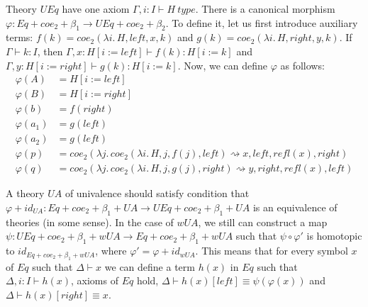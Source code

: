 \documentclass{mscs}
\newcommand{\deq}{\equiv}
\newcommand{\repl}{:=}
\newcommand{\idtype}{\rightsquigarrow}
\numberwithin{figure}{section}
\begin{document}
Theory $UEq$ have one axiom $\Gamma, i : I \vdash H\ type$.
There is a canonical morphism $\varphi : Eq + coe_2 + \beta_1 \to UEq + coe_2 + \beta_2$.
To define it, let us first introduce auxiliary terms: $f(k) = coe_2(\lambda i.\,H, left, x, k)$ and $g(k) = coe_2(\lambda i.\,H, right, y, k)$.
If $\Gamma \vdash k : I$, then $\Gamma, x : H[i \repl left] \vdash f(k) : H[i \repl k]$ and $\Gamma, y : H[i \repl right] \vdash g(k) : H[i \repl k]$.
Now, we can define $\varphi$ as follows:
\begin{align*}
\varphi(A) & = H[i \repl left] \\
\varphi(B) & = H[i \repl right] \\
\varphi(b) & = f(right) \\
\varphi(a_1) & = g(left) \\
\varphi(a_2) & = g(left) \\
\varphi(p) & = coe_2(\lambda j.\,coe_2(\lambda i.\,H, j, f(j), left) \idtype x, left, refl(x), right) \\
\varphi(q) & = coe_2(\lambda j.\,coe_2(\lambda i.\,H, j, g(j), right) \idtype y, right, refl(x), left)
\end{align*}

A theory $UA$ of univalence should satisfy condition that $\varphi + id_{UA} : Eq + coe_2 + \beta_1 + UA \to UEq + coe_2 + \beta_1 + UA$ is an equivalence of theories (in some sense).
In the case of $wUA$, we still can construct a map $\psi : UEq + coe_2 + \beta_1 + wUA \to Eq + coe_2 + \beta_1 + wUA$ such that $\psi \circ \varphi'$ is homotopic to $id_{Eq + coe_2 + \beta_1 + wUA}$, where $\varphi' = \varphi + id_{wUA}$.
This means that for every symbol $x$ of $Eq$ such that $\Delta \vdash x$ we can define a term $h(x)$ in $Eq$ such that
$\Delta, i : I \vdash h(x)$, axioms of $Eq$ hold, $\Delta \vdash h(x)[left] \deq \psi(\varphi(x))$ and $\Delta \vdash h(x)[right] \deq x$.
\end{document}
